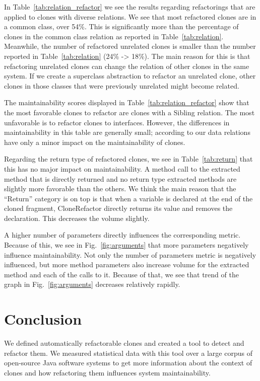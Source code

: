 \documentclass[sigconf,review, table]{acmart}
\begin{document}
In Table~\ref{tab:relation_refactor} we see the results regarding refactorings that are applied to clones with diverse relations. We see that most refactored clones are in a common class, over 54\%. This is significantly more than the percentage of clones in the common class relation as reported in Table~\ref{tab:relation}. Meanwhile, the number of refactored unrelated clones is smaller than the number reported in Table~\ref{tab:relation} (24\% -> 18\%). The main reason for this is that refactoring unrelated clones can change the relation of other clones in the same system. If we create a superclass abstraction to refactor an unrelated clone, other clones in those classes that were previously unrelated might become related.

The maintainability scores displayed in Table~\ref{tab:relation_refactor} show that the most favorable clones to refactor are clones with a Sibling relation. The most unfavorable is to refactor clones to interfaces. However, the differences in maintainability in this table are generally small; according to our data relations have only a minor impact on the maintainability of clones.

Regarding the return type of refactored clones, we see in Table~\ref{tab:return} that this has no major impact on maintainability. A method call to the extracted method that is directly returned and no return type extracted methods are slightly more favorable than the others. We think the main reason that the ``Return'' category is on top is that when a variable is declared at the end of the cloned fragment, CloneRefactor directly returns its value and removes the declaration. This decreases the volume slightly.

A higher number of parameters directly influences the corresponding metric. Because of this, we see in Fig.~\ref{fig:arguments} that more parameters negatively influence maintainability. Not only the number of parameters metric is negatively influenced, but more method parameters also increase volume for the extracted method and each of the calls to it. Because of that, we see that trend of the graph in Fig.~\ref{fig:arguments} decreases relatively rapidly.

\section{Conclusion}
We defined automatically refactorable clones and created a tool to detect and refactor them. We measured statistical data with this tool over a large corpus of open-source Java software systems to get more information about the context of clones and how refactoring them influences system maintainability.
\end{document}
